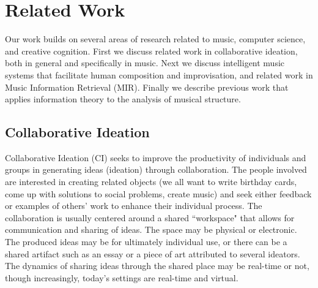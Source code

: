 \documentclass[final,authoryear,11pt,times]{elsarticle}
\begin{document}
\section{Related Work}

Our work builds on several areas of research related to music, computer science, and creative cognition. First we discuss related work in collaborative ideation, both in general and specifically in music. Next we discuss intelligent 
music systems that facilitate human composition and improvisation, and related work in Music Information Retrieval (MIR). Finally we describe previous work that applies information theory to the analysis of musical structure.


\subsection{Collaborative Ideation}

Collaborative Ideation (CI) seeks to improve the productivity of individuals and groups in generating ideas (ideation) through collaboration. The people involved are interested in creating related objects (we all want to write birthday cards, come up with solutions to social problems, create music) and seek either feedback or examples of others' work to enhance their individual process. The collaboration is usually centered around a shared ``workspace" that allows for communication and sharing of ideas. The space may be physical or electronic. The produced ideas may be for ultimately individual use, or there can be a shared artifact such as an essay or a piece of art attributed to several ideators. The dynamics of sharing ideas through the shared place may be real-time or not, though increasingly, today's settings are real-time and virtual.
\end{document}
